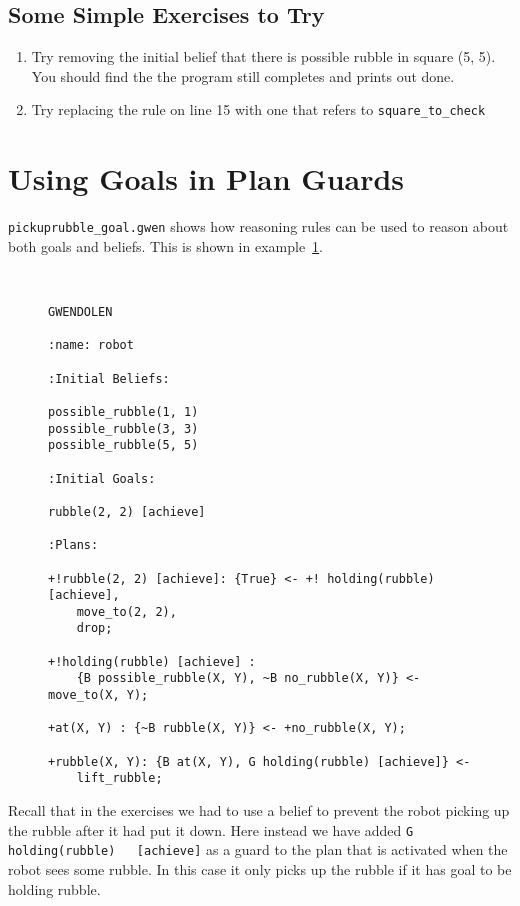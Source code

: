 \subsection{Some Simple Exercises to Try}
\begin{enumerate}
\item Try removing the initial belief that there is possible rubble in
  square (5, 5).  You should find the the program still completes and
  prints out done. 
\item Try replacing the rule on line 15 with one that refers to \lstinline{square_to_check}
\end{enumerate}



\section{Using Goals in Plan Guards}

\texttt{pickuprubble\_goal.gwen} shows how reasoning
rules can be used to reason about both goals
and beliefs.  This is shown in
example~\ref{code:pickuprubble_goal}. 
\begin{figure}[htb]
\begin{ourexample}
\label{code:pickuprubble_goal} \quad \\
\begin{lstlisting}[basicstyle=\sffamily,style=easslisting,language=Gwendolen]
GWENDOLEN

:name: robot

:Initial Beliefs:

possible_rubble(1, 1)
possible_rubble(3, 3)
possible_rubble(5, 5)

:Initial Goals:

rubble(2, 2) [achieve]

:Plans:

+!rubble(2, 2) [achieve]: {True} <- +! holding(rubble)[achieve],
    move_to(2, 2), 
    drop;

+!holding(rubble) [achieve] : 
    {B possible_rubble(X, Y), ~B no_rubble(X, Y)} <- move_to(X, Y);

+at(X, Y) : {~B rubble(X, Y)} <- +no_rubble(X, Y);

+rubble(X, Y): {B at(X, Y), G holding(rubble) [achieve]} <- 
    lift_rubble;
\end{lstlisting}
\end{ourexample}
\end{figure}
Recall that in the exercises
 we had to use a
belief to prevent the robot picking up the rubble after it had put it
down.  Here instead we have added \lstinline{G holding(rubble)
  [achieve]} as a guard to the plan that is
activated when the robot sees some rubble.  In this case it only picks
up the rubble if it has goal to be holding rubble. 

